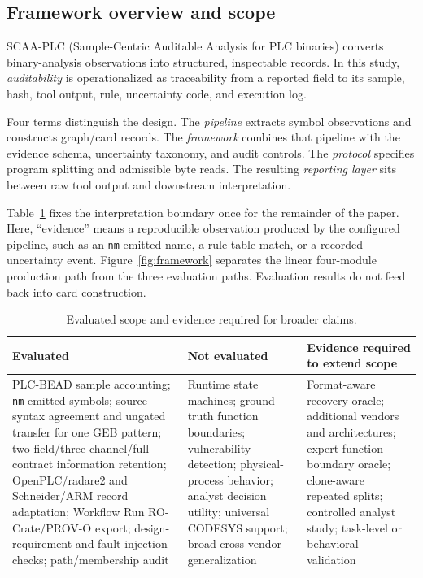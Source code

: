 \documentclass[a4paper,fleqn]{cas-dc}
\begin{document}
\subsection{Framework overview and scope}

SCAA-PLC (Sample-Centric Auditable Analysis for PLC binaries) converts binary-analysis observations into structured, inspectable records. In this study, \emph{auditability} is operationalized as traceability from a reported field to its sample, hash, tool output, rule, uncertainty code, and execution log.

Four terms distinguish the design. The \emph{pipeline} extracts symbol observations and constructs graph/card records. The \emph{framework} combines that pipeline with the evidence schema, uncertainty taxonomy, and audit controls. The \emph{protocol} specifies program splitting and admissible byte reads. The resulting \emph{reporting layer} sits between raw tool output and downstream interpretation.

Table~\ref{tab:scope} fixes the interpretation boundary once for the remainder of the paper. Here, ``evidence'' means a reproducible observation produced by the configured pipeline, such as an \texttt{nm}-emitted name, a rule-table match, or a recorded uncertainty event. Figure~\ref{fig:framework} separates the linear four-module production path from the three evaluation paths. Evaluation results do not feed back into card construction.

\begin{table}[t]
\centering
\normalsize
\caption{Evaluated scope and evidence required for broader claims.}
\label{tab:scope}
\begin{tabularx}{\textwidth}{>{\raggedright\arraybackslash}X>{\raggedright\arraybackslash}X>{\raggedright\arraybackslash}X}
\toprule
Evaluated & Not evaluated & Evidence required to extend scope \\
\midrule
PLC-BEAD sample accounting; \texttt{nm}-emitted symbols; source-syntax agreement and ungated transfer for one GEB pattern; two-field/three-channel/full-contract information retention; OpenPLC/radare2 and Schneider/ARM record adaptation; Workflow Run RO-Crate/PROV-O export; design-requirement and fault-injection checks; path/membership audit & Runtime state machines; ground-truth function boundaries; vulnerability detection; physical-process behavior; analyst decision utility; universal CODESYS support; broad cross-vendor generalization & Format-aware recovery oracle; additional vendors and architectures; expert function-boundary oracle; clone-aware repeated splits; controlled analyst study; task-level or behavioral validation \\
\bottomrule
\end{tabularx}
\end{table}
\end{document}
